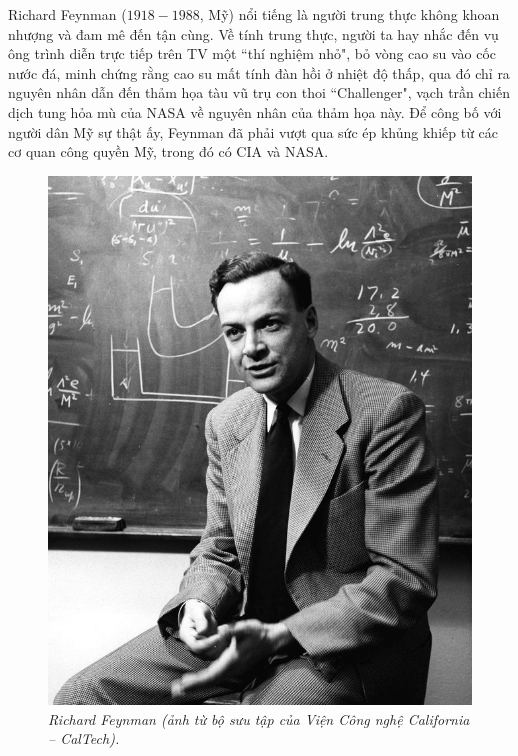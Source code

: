\begin{multicols}{2}
	Richard Feynman ($1918-1988$, Mỹ) nổi tiếng là người trung thực không khoan nhượng và đam mê đến tận cùng. Về tính trung thực, người ta hay nhắc đến vụ ông trình diễn trực tiếp trên TV một ``thí nghiệm nhỏ", bỏ vòng cao su vào cốc nước đá, minh chứng rằng cao su mất tính đàn hồi ở nhiệt độ thấp, qua đó chỉ ra nguyên nhân dẫn đến thảm họa tàu vũ trụ con thoi ``Challenger", vạch trần chiến dịch tung hỏa mù của NASA về nguyên nhân của thảm họa này. Để công bố với người dân Mỹ sự thật ấy, Feynman đã phải vượt qua sức ép khủng khiếp từ các cơ quan công quyền Mỹ, trong đó có CIA và NASA. 
	\begin{figure}[H]
		\vspace*{-5pt}
		\centering
		\captionsetup{labelformat= empty, justification=centering}
		\includegraphics[width= 1\linewidth]{1a}
		\caption{\small\textit{\color{quantoan}Richard Feynman (ảnh từ bộ sưu tập của Viện Công nghệ California -- CalTech).}}
		\vspace*{-10pt}
	\end{figure}

\end{multicols}
